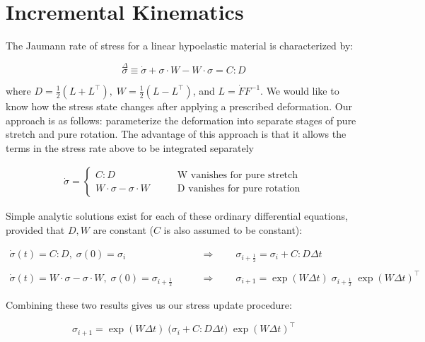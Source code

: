 \section{Incremental Kinematics}
%


\newcommand{\ds}{\displaystyle}
\newcommand{\mparen}[1]{\displaystyle \big( #1 \big)}
\newcommand{\mbrack}[1]{\displaystyle \big[ #1 \big]}
\newcommand{\bparen}[1]{\displaystyle \bigg( #1 \bigg)}
\newcommand{\bbrack}[1]{\displaystyle \bigg[ #1 \bigg]}

The Jaumann rate of stress for a linear hypoelastic material is characterized by:

$$ \overset{\Delta}{\sigma} \equiv 
\dot{\sigma} + \sigma \cdot W - W \cdot \sigma = 
C : D $$

where $ D = \frac{1}{2} (L + L^\top), \; W = \frac{1}{2} (L - L^\top)$, and $L = \dot{F}
F^{-1} $. We would like to know how the stress state changes after applying
a prescribed deformation. Our approach is as follows: parameterize the deformation
into separate stages of pure stretch and pure rotation. The advantage of this
approach is that it allows the terms in the stress rate above to be integrated
separately

\begin{align*}
\dot{\sigma} = 
\begin{cases}
C : D & \qquad \text{W vanishes for pure stretch} \\
W \cdot \sigma - \sigma \cdot W & \qquad \text{D vanishes for pure rotation}
\end{cases}
\end{align*}

Simple analytic solutions exist for each of these ordinary differential equations, 
provided that $D, W$ are constant ($C$ is also assumed to be constant):

\begin{align*}
\dot{\sigma}(t) = C : D, \; \sigma(0) = \sigma_i 
\qquad 
& \Longrightarrow 
\qquad 
\sigma_{i+\frac{1}{2}}  = \sigma_i + C : D \Delta t \\ \\
\dot{\sigma}(t) = W \cdot \sigma - \sigma \cdot W, \; \sigma(0) = \sigma_{i+\frac{1}{2}} 
\qquad 
& \Longrightarrow 
\qquad 
\sigma_{i+1} = \exp(W \Delta t) \; \sigma_{i+\frac{1}{2}} \; \exp(W \Delta t)^{\top}
\end{align*}

Combining these two results gives us our stress update procedure:

$$ \sigma_{i+1} = \exp(W \Delta t) \; \bparen{\sigma_i + C : D \Delta t} \; \exp(W \Delta t)^{\top} $$

